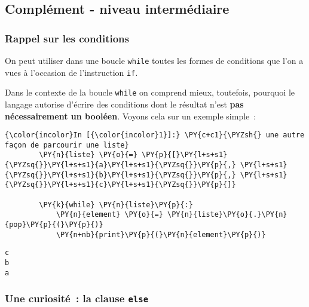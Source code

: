     \hypertarget{compluxe9ment---niveau-intermuxe9diaire}{%
\subsection{Complément - niveau
intermédiaire}\label{compluxe9ment---niveau-intermuxe9diaire}}

    \hypertarget{rappel-sur-les-conditions}{%
\subsubsection{Rappel sur les
conditions}\label{rappel-sur-les-conditions}}

    On peut utiliser dans une boucle \texttt{while} toutes les formes de
conditions que l'on a vues à l'occasion de l'instruction \texttt{if}.

Dans le contexte de la boucle \texttt{while} on comprend mieux,
toutefois, pourquoi le langage autorise d'écrire des conditions dont le
résultat n'est \textbf{pas nécessairement un booléen}. Voyons cela sur
un exemple simple~:

    \begin{Verbatim}[commandchars=\\\{\},frame=single,framerule=0.3mm,rulecolor=\color{cellframecolor}]
{\color{incolor}In [{\color{incolor}1}]:} \PY{c+c1}{\PYZsh{} une autre façon de parcourir une liste}
        \PY{n}{liste} \PY{o}{=} \PY{p}{[}\PY{l+s+s1}{\PYZsq{}}\PY{l+s+s1}{a}\PY{l+s+s1}{\PYZsq{}}\PY{p}{,} \PY{l+s+s1}{\PYZsq{}}\PY{l+s+s1}{b}\PY{l+s+s1}{\PYZsq{}}\PY{p}{,} \PY{l+s+s1}{\PYZsq{}}\PY{l+s+s1}{c}\PY{l+s+s1}{\PYZsq{}}\PY{p}{]}
        
        \PY{k}{while} \PY{n}{liste}\PY{p}{:}
            \PY{n}{element} \PY{o}{=} \PY{n}{liste}\PY{o}{.}\PY{n}{pop}\PY{p}{(}\PY{p}{)}
            \PY{n+nb}{print}\PY{p}{(}\PY{n}{element}\PY{p}{)}
\end{Verbatim}


    \begin{Verbatim}[commandchars=\\\{\},frame=single,framerule=0.3mm,rulecolor=\color{cellframecolor}]
c
b
a
\end{Verbatim}

    \hypertarget{une-curiosituxe9-la-clause-else}{%
\subsubsection{\texorpdfstring{Une curiosité~: la clause
\texttt{else}}{Une curiosité~: la clause else}}\label{une-curiosituxe9-la-clause-else}}

